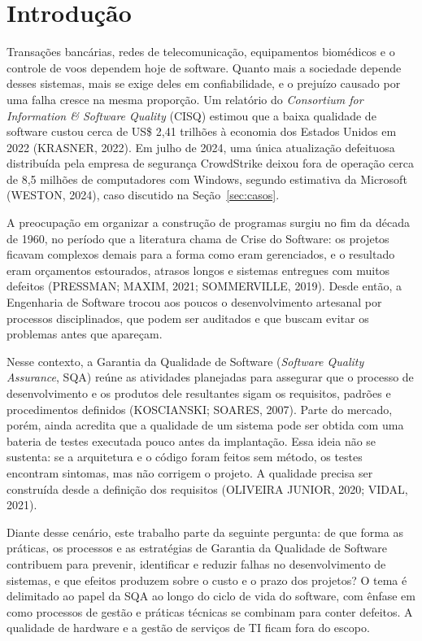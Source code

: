 \documentclass[12pt,a4paper]{article}
\begin{document}
\section{Introdução}

Transações bancárias, redes de telecomunicação, equipamentos biomédicos e o controle de voos dependem hoje de software. Quanto mais a sociedade depende desses sistemas, mais se exige deles em confiabilidade, e o prejuízo causado por uma falha cresce na mesma proporção. Um relatório do \textit{Consortium for Information \& Software Quality} (CISQ) estimou que a baixa qualidade de software custou cerca de US\$ 2,41 trilhões à economia dos Estados Unidos em 2022 (KRASNER, 2022). Em julho de 2024, uma única atualização defeituosa distribuída pela empresa de segurança CrowdStrike deixou fora de operação cerca de 8,5 milhões de computadores com Windows, segundo estimativa da Microsoft (WESTON, 2024), caso discutido na Seção~\ref{sec:casos}.

A preocupação em organizar a construção de programas surgiu no fim da década de 1960, no período que a literatura chama de Crise do Software: os projetos ficavam complexos demais para a forma como eram gerenciados, e o resultado eram orçamentos estourados, atrasos longos e sistemas entregues com muitos defeitos (PRESSMAN; MAXIM, 2021; SOMMERVILLE, 2019). Desde então, a Engenharia de Software trocou aos poucos o desenvolvimento artesanal por processos disciplinados, que podem ser auditados e que buscam evitar os problemas antes que apareçam.

Nesse contexto, a Garantia da Qualidade de Software (\textit{Software Quality Assurance}, SQA) reúne as atividades planejadas para assegurar que o processo de desenvolvimento e os produtos dele resultantes sigam os requisitos, padrões e procedimentos definidos (KOSCIANSKI; SOARES, 2007). Parte do mercado, porém, ainda acredita que a qualidade de um sistema pode ser obtida com uma bateria de testes executada pouco antes da implantação. Essa ideia não se sustenta: se a arquitetura e o código foram feitos sem método, os testes encontram sintomas, mas não corrigem o projeto. A qualidade precisa ser construída desde a definição dos requisitos (OLIVEIRA JUNIOR, 2020; VIDAL, 2021).

Diante desse cenário, este trabalho parte da seguinte pergunta: de que forma as práticas, os processos e as estratégias de Garantia da Qualidade de Software contribuem para prevenir, identificar e reduzir falhas no desenvolvimento de sistemas, e que efeitos produzem sobre o custo e o prazo dos projetos? O tema é delimitado ao papel da SQA ao longo do ciclo de vida do software, com ênfase em como processos de gestão e práticas técnicas se combinam para conter defeitos. A qualidade de hardware e a gestão de serviços de TI ficam fora do escopo.
\end{document}
